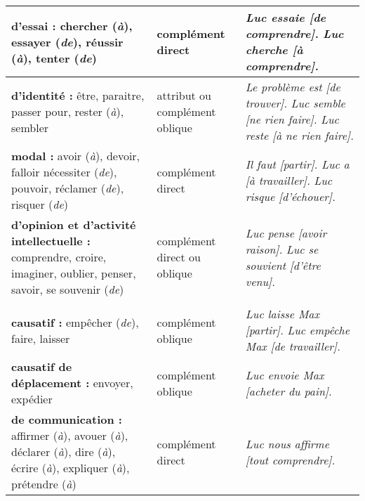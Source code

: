 \documentclass[UTF8]{report}
\begin{document}
\begin{table}[H]
\begin{adjustbox}{max width=\textwidth}
\begin{tabular}{| L{6.8cm} | L{2.5cm} | L{5.5cm} |}
        \hline
        \textbf{d’essai :} \newline chercher (\textit{à}), essayer (\textit{de}), réussir (\textit{à}), tenter (\textit{de}) & complément direct & \textit{Luc essaie [de comprendre].} \newline \textit{Luc cherche [à comprendre].} \\
        \hline
        \textbf{d’identité :} \newline être, paraitre, passer pour, rester (\textit{à}), sembler & attribut ou complément oblique & \textit{Le problème est [de trouver].} \newline \textit{Luc semble [ne rien faire].} \newline \textit{Luc reste [à ne rien faire].} \\
        \hline
        \textbf{modal :} \newline avoir (\textit{à}), devoir, falloir nécessiter (\textit{de}), pouvoir, réclamer (\textit{de}), risquer (\textit{de}) & complément direct & \textit{Il faut [partir].} \newline \textit{Luc a [à travailler].} \newline \textit{Luc risque [d’échouer].} \\
        \hline
        \textbf{d’opinion et d’activité intellectuelle :} \newline comprendre, croire, imaginer, oublier, penser, savoir, se souvenir (\textit{de}) & complément direct ou oblique & \textit{Luc pense [avoir raison].} \newline \textit{Luc se souvient [d’être venu].} \\
        \hline
         \\ %
        \hline
        \textbf{causatif :} \newline empêcher (\textit{de}), faire, laisser & complément oblique & \textit{Luc laisse Max [partir].} \newline \textit{Luc empêche Max [de travailler].} \\
        \hline
        \textbf{causatif de déplacement :} \newline envoyer, expédier & complément oblique & \textit{Luc envoie Max [acheter du pain].} \\
        \hline
        \textbf{de communication :} \newline affirmer (\textit{à}), avouer (\textit{à}), déclarer (\textit{à}), dire (\textit{à}), écrire (\textit{à}), expliquer (\textit{à}), prétendre (\textit{à}) & complément direct & \textit{Luc nous affirme [tout comprendre].} \\

\end{tabular}
\end{adjustbox}
\end{table}
\end{document}
